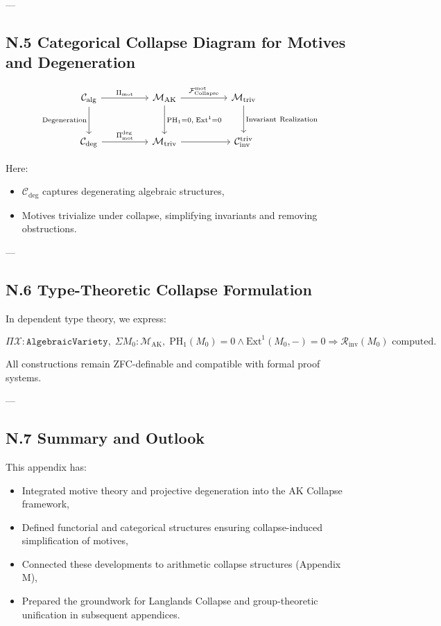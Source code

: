 \documentclass[11pt]{article}
\begin{document}
---

\subsection*{N.5 Categorical Collapse Diagram for Motives and Degeneration}

\[
\begin{tikzcd}[column sep=huge, row sep=large]
\mathcal{C}_{\mathrm{alg}} \arrow[r, "{\Pi_{\mathrm{mot}}}"] \arrow[d, "{\mathrm{Degeneration}}"']
& \mathcal{M}_{\mathrm{AK}} \arrow[r, "{\mathcal{F}_{\mathrm{Collapse}}^{\mathrm{mot}}}"] \arrow[d, "{\mathrm{PH}_1 = 0,\; \mathrm{Ext}^1 = 0}"]
& \mathcal{M}_{\mathrm{triv}} \arrow[d, "{\mathrm{Invariant\ Realization}}"] \\
\mathcal{C}_{\mathrm{deg}} \arrow[r, "{\Pi_{\mathrm{mot}}^{\mathrm{deg}}}"]
& \mathcal{M}_{\mathrm{triv}} \arrow[r]
& \mathcal{C}_{\mathrm{inv}}^{\mathrm{triv}}
\end{tikzcd}
\]


Here:
\begin{itemize}
  \item \( \mathcal{C}_{\mathrm{deg}} \) captures degenerating algebraic structures,
  \item Motives trivialize under collapse, simplifying invariants and removing obstructions.
\end{itemize}

---

\subsection*{N.6 Type-Theoretic Collapse Formulation}

In dependent type theory, we express:

\[
\Pi \mathcal{X} : \texttt{AlgebraicVariety}, \;
\Sigma M_0 : \mathcal{M}_{\mathrm{AK}}, \;
\mathrm{PH}_1(M_0) = 0 \wedge \mathrm{Ext}^1(M_0, -) = 0
\Rightarrow 
\mathcal{R}_{\mathrm{inv}}(M_0) \text{ computed}.
\]

All constructions remain ZFC-definable and compatible with formal proof systems.

---

\subsection*{N.7 Summary and Outlook}

This appendix has:
\begin{itemize}
  \item Integrated motive theory and projective degeneration into the AK Collapse framework,
  \item Defined functorial and categorical structures ensuring collapse-induced simplification of motives,
  \item Connected these developments to arithmetic collapse structures (Appendix M),
  \item Prepared the groundwork for Langlands Collapse and group-theoretic unification in subsequent appendices.
\end{itemize}
\end{document}
